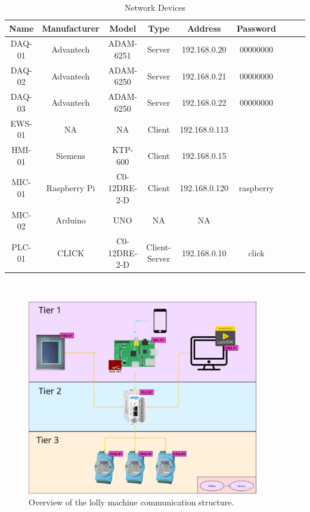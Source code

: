     \begin{table}[H]
        \caption{Network Devices}
        \begin{center}
            \begin{tabular}{|c|c|c|c|c|c|c|c|c|}
                \hline
                \textbf{Name} & \textbf{Manufacturer} & \textbf{Model} & \textbf{Type} & \textbf{Address}  & \textbf{Password}\\
                \hline
                DAQ-01 & Advantech & ADAM-6251 & Server & 192.168.0.20 & 00000000\\
                DAQ-02 & Advantech & ADAM-6250 & Server & 192.168.0.21 & 00000000\\
                DAQ-03 & Advantech & ADAM-6250 & Server & 192.168.0.22 & 00000000\\
                EWS-01 & NA & NA & Client & 192.168.0.113 & \\
                HMI-01 & Siemens & KTP-600 & Client & 192.168.0.15 & \\
                MIC-01 & Raspberry Pi & C0-12DRE-2-D & Client & 192.168.0.120 & raspberry\\
                MIC-02 & Arduino & UNO & NA & NA & \\
                PLC-01 & CLICK & C0-12DRE-2-D & Client-Server & 192.168.0.10 & click\\

                \hline
            \end{tabular}\\
        \end{center}
        \label{table:networkDevices}
    \end{table}
    
        \begin{figure}[H]
            \centering
            \includegraphics[width = 0.9\textwidth]{2_images/networkArcitecture.jpg}
            \caption{Overview of the lolly machine communication structure.}
            \label{fig:networkArcitecture}
        \end{figure}     
        



